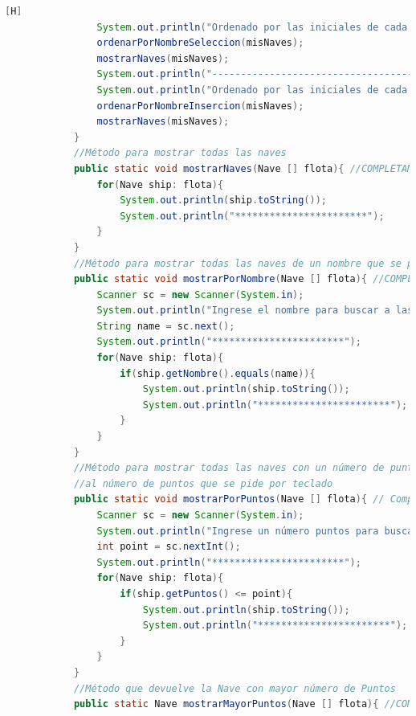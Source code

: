\documentclass{article}
\begin{document}
\begin{lstlisting}[language=java,caption={Las lineas de codigo de lo creado:}][H]
				System.out.println("Ordenado por las iniciales de cada nombre de A a la Z mediante el metodo seleccion: ");
				ordenarPorNombreSeleccion(misNaves);
				mostrarNaves(misNaves);
				System.out.println("--------------------------------------");
				System.out.println("Ordenado por las iniciales de cada nombre de Z a la A mediante el metodo insercion: ");
				ordenarPorNombreInsercion(misNaves);
				mostrarNaves(misNaves);
			}
			//Método para mostrar todas las naves
			public static void mostrarNaves(Nave [] flota){ //COMPLETAMOS EL METODO mostrarNaves Y NOS AYUDAMOS DE UN FOR EACH PARA EL MUESTREO DE LOS DATOS DE CADA OBJETO Y TAMBIEN USAMOS EL METODO toString()
				for(Nave ship: flota){
					System.out.println(ship.toString());
					System.out.println("***********************");
				}
			}
			//Método para mostrar todas las naves de un nombre que se pide por teclado
			public static void mostrarPorNombre(Nave [] flota){ //COMPLETAMOS EL METODO mostrarPorNombre Y NOS AYUDAMOS DE UN FOR EACH CON TAL QUE SI EL NOMBRE INGRESADO ERA IGUAL AL OBJETO CREADO MOSTRABA LOS DATOS DEL OBJETO Y TAMBIEN USAMOS EL METODO toString()
				Scanner sc = new Scanner(System.in);
				System.out.println("Ingrese el nombre para buscar a las naves: ");
				String name = sc.next();
				System.out.println("***********************");
				for(Nave ship: flota){
					if(ship.getNombre().equals(name)){
						System.out.println(ship.toString());
						System.out.println("***********************");
					}
				}
			}
			//Método para mostrar todas las naves con un número de puntos inferior o igual
			//al número de puntos que se pide por teclado
			public static void mostrarPorPuntos(Nave [] flota){ // Completamos el metodo mostrarPorPuntos donde ingresamos un numero de puntos en esta usamos un for each que pase por todos los elementos donde si su numero de puntos es menor o igual a este numero ingresado se imprimira sus datos
				Scanner sc = new Scanner(System.in);
				System.out.println("Ingrese un número puntos para buscar a las naves que son menor o igual a esta: ");
				int point = sc.nextInt();
				System.out.println("***********************");
				for(Nave ship: flota){
					if(ship.getPuntos() <= point){
						System.out.println(ship.toString());
						System.out.println("***********************");
					}
				}
			}
			//Método que devuelve la Nave con mayor número de Puntos
			public static Nave mostrarMayorPuntos(Nave [] flota){ //COMPLETAMOS ESTE METODO mostrarMayorPuntos DONDE CREAMOS UN OBJETO DE LA CLASE NAVE QUE ES SHIP EN ESTE PODREMOS GUARDAR LOS DATOS DE LA NAVE CON LA MAYOR CANTIDAD DE PUNTOS Y DESPUES RETONARNLO

\end{lstlisting}
\end{document}
